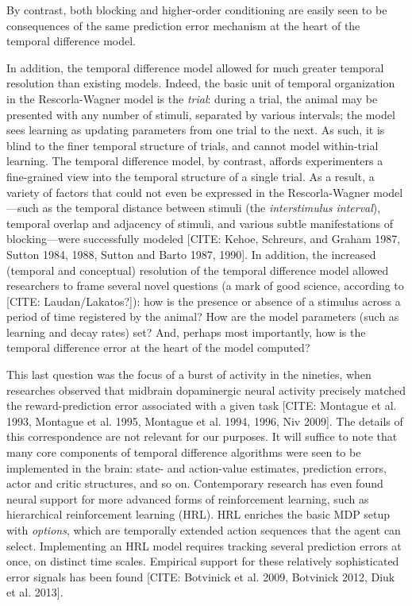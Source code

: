 By contrast, both blocking and higher-order conditioning are easily seen to be consequences of the same prediction error mechanism at the heart of the temporal difference model.

In addition, the temporal difference model allowed for much greater temporal resolution than existing models.
Indeed, the basic unit of temporal organization in the Rescorla-Wagner model is the \emph{trial}: during a trial, the animal may be presented with any number of stimuli, separated by various intervals; the model sees learning as updating parameters from one trial to the next.
As such, it is blind to the finer temporal structure of trials, and cannot model within-trial learning.
The temporal difference model, by contrast, affords experimenters a fine-grained view into the temporal structure of a single trial.
As a result, a variety of factors that could not even be expressed in the Rescorla-Wagner model---such as the temporal distance between stimuli (the \emph{interstimulus interval}), temporal overlap and adjacency of stimuli, and various subtle manifestations of blocking---were successfully modeled [CITE: Kehoe, Schreurs, and Graham 1987, Sutton 1984, 1988, Sutton and Barto 1987, 1990].
In addition, the increased (temporal and conceptual) resolution of the temporal difference model allowed researchers to frame several novel questions (a mark of good science, according to [CITE: Laudan/Lakatos?]): how is the presence or absence of a stimulus across a period of time registered by the animal?
How are the model parameters (such as learning and decay rates) set?
And, perhaps most importantly, how is the temporal difference error at the heart of the model computed?

This last question was the focus of a burst of activity in the nineties, when researches observed that midbrain dopaminergic neural activity precisely matched the reward-prediction error associated with a given task [CITE: Montague et al. 1993, Montague et al. 1995, Montague et al. 1994, 1996, Niv 2009].
The details of this correspondence are not relevant for our purposes.
It will suffice to note that many core components of temporal difference algorithms were seen to be implemented in the brain: state- and action-value estimates, prediction errors, actor and critic structures, and so on.
Contemporary research has even found neural support for more advanced forms of reinforcement learning, such as hierarchical reinforcement learning (HRL).
HRL enriches the basic MDP setup with \emph{options}, which are temporally extended action sequences that the agent can select.
Implementing an HRL model requires tracking several prediction errors at once, on distinct time scales.
Empirical support for these relatively sophisticated error signals has been found [CITE: Botvinick et al. 2009, Botvinick 2012, Diuk et al. 2013].


